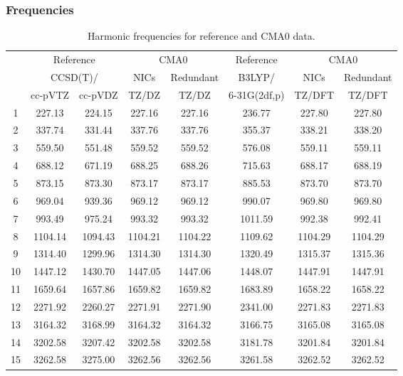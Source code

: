 \documentclass[10pt,oneside]{article}
\begin{document}
\begin{table}[h!]
\subsubsection*{Frequencies}
\centering
\caption{Harmonic frequencies for reference and CMA0 data.}
\begin{tabular}{cccccccc}
\toprule
{} & \multicolumn{2}{c}{Reference} & \multicolumn{2}{c}{CMA0} &    Reference & \multicolumn{2}{c}{CMA0} \\
{} & \multicolumn{2}{c}{CCSD(T)/} &    NICs &  Redundant &       B3LYP/ &    NICs & Redundant \\
{} &   cc-pVTZ & cc-pVDZ &   TZ/DZ &      TZ/DZ & 6-31G(2df,p) &  TZ/DFT &    TZ/DFT \\
\midrule
1  &    227.13 &  224.15 &  227.16 &     227.16 &       236.77 &  227.80 &    227.80 \\
2  &    337.74 &  331.44 &  337.76 &     337.76 &       355.37 &  338.21 &    338.20 \\
3  &    559.50 &  551.48 &  559.52 &     559.52 &       576.08 &  559.11 &    559.11 \\
4  &    688.12 &  671.19 &  688.25 &     688.26 &       715.63 &  688.17 &    688.19 \\
5  &    873.15 &  873.30 &  873.17 &     873.17 &       885.53 &  873.70 &    873.70 \\
6  &    969.04 &  939.36 &  969.12 &     969.12 &       990.07 &  969.80 &    969.80 \\
7  &    993.49 &  975.24 &  993.32 &     993.32 &      1011.59 &  992.38 &    992.41 \\
8  &   1104.14 & 1094.43 & 1104.21 &    1104.22 &      1109.62 & 1104.29 &   1104.29 \\
9  &   1314.40 & 1299.96 & 1314.30 &    1314.30 &      1320.49 & 1315.37 &   1315.36 \\
10 &   1447.12 & 1430.70 & 1447.05 &    1447.06 &      1448.07 & 1447.91 &   1447.91 \\
11 &   1659.64 & 1657.86 & 1659.82 &    1659.82 &      1683.89 & 1658.22 &   1658.22 \\
12 &   2271.92 & 2260.27 & 2271.91 &    2271.90 &      2341.00 & 2271.83 &   2271.83 \\
13 &   3164.32 & 3168.99 & 3164.32 &    3164.32 &      3166.75 & 3165.08 &   3165.08 \\
14 &   3202.58 & 3207.42 & 3202.58 &    3202.58 &      3181.78 & 3201.84 &   3201.84 \\
15 &   3262.58 & 3275.00 & 3262.56 &    3262.56 &      3261.58 & 3262.52 &   3262.52 \\
\bottomrule
\end{tabular}
\end{table}
\end{document}
